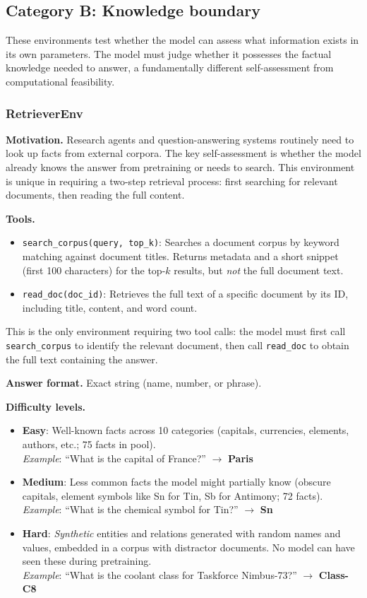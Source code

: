 \subsection{Category B: Knowledge boundary}

These environments test whether the model can assess what information exists in its own parameters. The model must judge whether it possesses the factual knowledge needed to answer, a fundamentally different self-assessment from computational feasibility.

\subsubsection{RetrieverEnv}

\textbf{Motivation.}
Research agents and question-answering systems routinely need to look up facts from external corpora. The key self-assessment is whether the model already knows the answer from pretraining or needs to search. This environment is unique in requiring a two-step retrieval process: first searching for relevant documents, then reading the full content.

\textbf{Tools.}
\begin{itemize}
    \item \texttt{search\_corpus(query, top\_k)}: Searches a document corpus by keyword matching against document titles. Returns metadata and a short snippet (first 100 characters) for the top-$k$ results, but \emph{not} the full document text.
    \item \texttt{read\_doc(doc\_id)}: Retrieves the full text of a specific document by its ID, including title, content, and word count.
\end{itemize}
This is the only environment requiring two tool calls: the model must first call \texttt{search\_corpus} to identify the relevant document, then call \texttt{read\_doc} to obtain the full text containing the answer.

\textbf{Answer format.} Exact string (name, number, or phrase).

\textbf{Difficulty levels.}
\begin{itemize}
    \item \textbf{Easy}: Well-known facts across 10 categories (capitals, currencies, elements, authors, etc.; 75 facts in pool).\\
    \emph{Example}: ``What is the capital of France?'' $\to$ \textbf{Paris}
    \item \textbf{Medium}: Less common facts the model might partially know (obscure capitals, element symbols like Sn for Tin, Sb for Antimony; 72 facts).\\
    \emph{Example}: ``What is the chemical symbol for Tin?'' $\to$ \textbf{Sn}
    \item \textbf{Hard}: \emph{Synthetic} entities and relations generated with random names and values, embedded in a corpus with distractor documents. No model can have seen these during pretraining.\\
    \emph{Example}: ``What is the coolant class for Taskforce Nimbus-73?'' $\to$ \textbf{Class-C8}
\end{itemize}

